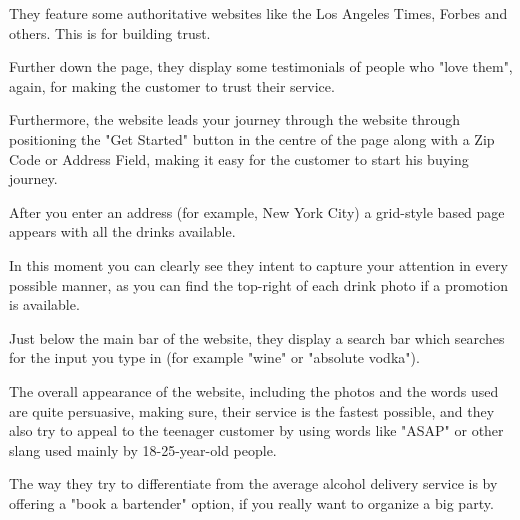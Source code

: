 \documentclass[12p]{article}
\begin{document}
They feature some authoritative websites like the Los Angeles Times, Forbes and others. This is for building trust.

Further down the page, they display some testimonials of people who "love them", again, for making the customer to trust their service.

Furthermore, the website leads your journey through the website through positioning the "Get Started" button in the centre of the page along with a Zip Code or Address Field, making it easy for the customer to start his buying journey.

After you enter an address (for example, New York City) a grid-style based page appears with all the drinks available.

In this moment you can clearly see they intent to capture your attention in every possible manner, as you can find the top-right of each drink photo if a promotion is available.

Just below the main bar of the website, they display a search bar which searches for the input you type in (for example "wine" or "absolute vodka").

The overall appearance of the website, including the photos and the words used are quite persuasive, making sure, their service is the fastest possible, and they also try to appeal to the teenager customer by using words like "ASAP" or other slang used mainly by 18-25-year-old people.

The way they try to differentiate from the average alcohol delivery service is by offering a "book a bartender" option, if you really want to organize a big party.
\end{document}
